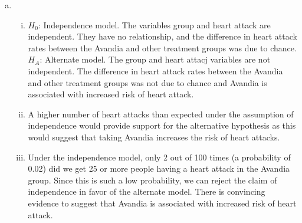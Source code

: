 {{\begin{enumerate}[(a)]
\item 
\begin{enumerate}[i.]
\item $H_0$: Independence model. The variables group and heart attack are independent. They have no relationship, and the difference in heart attack rates between the Avandia and other treatment groups was due to chance.
$H_A$: Alternate model. The group and heart attacj variables are not independent. The difference in heart attack rates between the Avandia and other treatment groups was not due to chance and Avandia is associated with increased risk of heart attack.
\item A higher number of heart attacks than expected under the assumption of independence would provide support for the alternative hypothesis as this would suggest that taking Avandia increases the risk of heart attacks.
\item Under the independence model, only 2 out of 100 times (a probability of 0.02) did we get 25 or more people having a heart attack in the Avandia group. Since this is such a low probability, we can reject the claim of independence in favor of the alternate model. There is convincing evidence to suggest that Avandia is associated with increased risk of heart attack.
\end{enumerate}
\end{enumerate}
}}



%
%	

